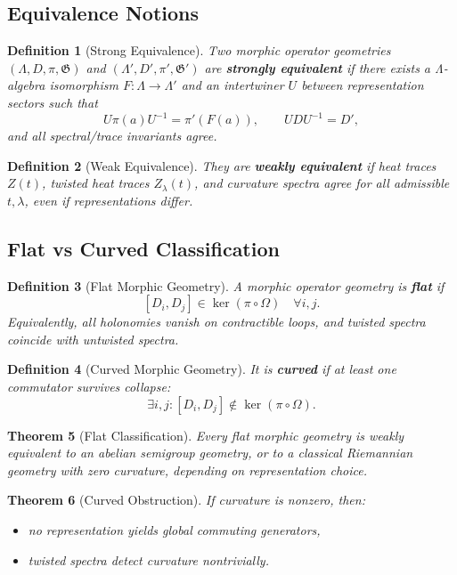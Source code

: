 \documentclass[12pt, oneside]{article}
\newtheorem{theorem}{Theorem}[section]
\newtheorem{definition}[theorem]{Definition}
\begin{document}
\subsection{Equivalence Notions}

\begin{definition}[Strong Equivalence]
Two morphic operator geometries $(\Lambda, D, \pi, \mathfrak{G})$ and $(\Lambda', D', \pi', \mathfrak{G}')$ are \textbf{strongly equivalent} if there exists a Λ-algebra isomorphism $F: \Lambda \to \Lambda'$ and an intertwiner $U$ between representation sectors such that
\[
U \pi(a) U^{-1} = \pi'(F(a)), \qquad U D U^{-1} = D',
\]
and all spectral/trace invariants agree.
\end{definition}

\begin{definition}[Weak Equivalence]
They are \textbf{weakly equivalent} if heat traces $Z(t)$, twisted heat traces $Z_\lambda(t)$, and curvature spectra agree for all admissible $t,\lambda$, even if representations differ.
\end{definition}

\subsection{Flat vs Curved Classification}

\begin{definition}[Flat Morphic Geometry]
A morphic operator geometry is \textbf{flat} if
\[
[D_i, D_j] \in \ker(\pi \circ \Omega) \quad \forall i,j.
\]
Equivalently, all holonomies vanish on contractible loops, and twisted spectra coincide with untwisted spectra.
\end{definition}

\begin{definition}[Curved Morphic Geometry]
It is \textbf{curved} if at least one commutator survives collapse:
\[
\exists i,j : [D_i, D_j] \notin \ker(\pi \circ \Omega).
\]
\end{definition}

\begin{theorem}[Flat Classification]
Every flat morphic geometry is weakly equivalent to an abelian semigroup geometry, or to a classical Riemannian geometry with zero curvature, depending on representation choice.
\end{theorem}

\begin{theorem}[Curved Obstruction]
If curvature is nonzero, then:
\begin{itemize}
    \item no representation yields global commuting generators,
    \item twisted spectra detect curvature nontrivially.
\end{itemize}
\end{theorem}
\end{document}
